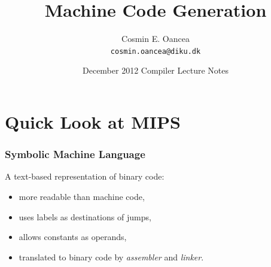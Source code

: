 \documentclass{beamer}
\title[Machine Code]{Machine Code Generation}
\author[C.~Oancea]{Cosmin E. Oancea\\{\tt cosmin.oancea@diku.dk}}
\institute{Department of Computer Science (DIKU)\\University of Copenhagen}
\date[December 2012]{December 2012 Compiler Lecture Notes}
\begin{document}
\titleslide



\begin{frame}[fragile]
	\tableofcontents
\end{frame}


\section{Quick Look at MIPS}

\begin{frame}[fragile,t]
   \frametitle{Symbolic Machine Language}

\bigskip
\bigskip

A text-based representation of binary code:

\bigskip

\begin{itemize}

    \item more readable than machine code,\bigskip

    \item uses labels as destinations of jumps,\bigskip

    \item allows constants as operands,\bigskip

    \item translated to binary code by {\em assembler} and {\em linker}.

\end{itemize}

\end{frame}
\end{document}
